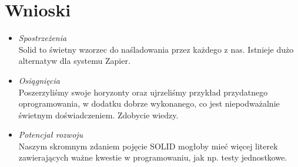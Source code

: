 \documentclass[12pt,a4paper]{article}
\begin{document}
\section{Wnioski}

\begin{itemize}
    \item \textit{Spostrzeżenia} \\
    Solid to świetny wzorzec do naśladowania przez każdego z nas. Istnieje dużo alternatyw dla systemu Zapier.
    \item \textit{Osiągnięcia}\\
    Poszerzyliśmy swoje horyzonty oraz ujrzeliśmy przykład przydatnego oprogramowania, w dodatku dobrze wykonanego, co jest niepodważalnie świetnym doświadczeniem. Zdobycie wiedzy.
    \item \textit{Potencjał rozwoju}\\
    Naszym skromnym zdaniem pojęcie SOLID mogłoby mieć więcej literek zawierających ważne kwestie w programowaniu, jak np. testy jednostkowe.
\end{itemize}
\end{document}
